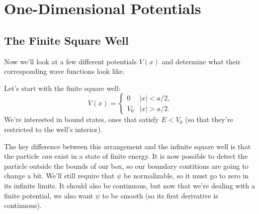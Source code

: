 \documentclass[../p052main.tex]{subfiles}
\begin{document}
\chapter{One-Dimensional Potentials}
\section{The Finite Square Well}
Now we'll look at a few different potentials $V(x)$ and determine what their corresponding wave functions look like.

Let's start with the finite square well:
\[ V(x) = \begin{cases} 0 & |x| < a/2, \\ V_0 & |x| > a/2. \end{cases} \]
We're interested in bound states, ones that satisfy $E < V_0$ (so that they're restricted to the well's interior).

The key difference between this arrangement and the infinite square well is that the particle \textit{can} exist in a state of finite energy.
It is now possible to detect the particle outside the bounds of our box, so our boundary contitions are going to change a bit.
We'll still require that $\psi$ be normalizable, so it must go to zero in its infinite limits.
It should also be continuous, but now that we're dealing with a finite potential, we also want $\psi$ to be smooth (so its first derivative is continuous).
\end{document}
